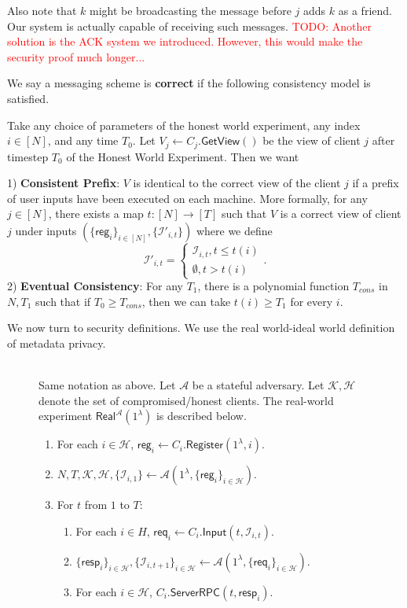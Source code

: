 \documentclass[sigconf, nonacm, balance=false, natbib=false, screen]{acmart}
\newcommand\todo[1]{\textcolor{red}{TODO: #1}}
\newcommand{\reg}{\mathsf{reg}}
\newcommand{\req}{\mathsf{req}}
\newcommand{\resp}{\mathsf{resp}}
\newcommand{\cK}{\mathcal{K}}
\newcommand{\cA}{\mathcal{A}}
\newcommand{\cI}{\mathcal{I}}
\newcommand{\cH}{\mathcal{H}}
\begin{document}
Also note that $k$ might be broadcasting the message before $j$ adds $k$ as a friend. Our system is actually capable of receiving such messages.
\todo{Another solution is the ACK system we introduced. However, this would make the security proof much longer...}
\begin{definition}[Correctness]
 We say a messaging scheme is \textbf{correct} if the following consistency model is satisfied. 
 
 Take any choice of parameters of the honest world experiment, any index $i \in [N]$, and any time $T_0$. Let $V_j \leftarrow C_j.\mathsf{GetView}()$ be the view of client $j$ after timestep $T_0$ of the Honest World Experiment. Then we want

1) \textbf{Consistent Prefix}: $V$ is identical to the correct view of the client $j$ if a prefix of user inputs have been executed on each machine. More formally, for any $j \in [N]$, there exists a map $t: [N] \to [T]$ such that  $V$ is a correct view of client $j$ under inputs $(\{\reg_i\}_{i \in [N]}, \{\cI'_{i, t}\})$
where we define
$$\cI'_{i, t} = \begin{cases}
\cI_{i, t}, t \leq t(i) \\
\emptyset, t > t(i)
\end{cases}.$$
2) \textbf{Eventual Consistency}: For any $T_1$, there is a polynomial function $T_{cons}$ in $N, T_1$ such that if $T_0 \geq T_{cons}$, then we can take $t(i) \geq T_1$ for every $i$.
\end{definition}
We now turn to security definitions. We use the real world-ideal world definition of metadata privacy.
\begin{figure}[h!]
\begin{framed}
\begin{definition} \hfill\\
Same notation as above. Let $\cA$ be a stateful adversary. Let $\cK, \cH$ denote the set of compromised/honest clients. The real-world experiment $\mathsf{Real}^{\cA}(1^{\lambda})$ is described below.
\begin{enumerate}
\item For each $i \in \cH$, $\reg_i \leftarrow C_i.\mathsf{Register}(1^{\lambda}, i)$. 
\item $N, T, \cK, \cH, \{\cI_{i, 1}\} \leftarrow \cA(1^{\lambda}, \{\reg_i\}_{i \in \cH})$.
\item For $t$ from $1$ to $T$:
    \begin{enumerate}
    \item For each $i \in H$, $\req_i \leftarrow C_i.\mathsf{Input}(t, \cI_{i, t})$.
    
    \item $\{\resp_i\}_{i \in \cH}, \{\cI_{i, t + 1}\}_{i \in \cH} \leftarrow \cA(1^{\lambda}, \{\req_i\}_{i \in \cH})$.
    
    \item For each $i \in \cH$, $C_i.\mathsf{ServerRPC}(t, \resp_i)$.
    \end{enumerate}
\end{enumerate}
\end{definition}
\end{framed}
\end{figure}
\end{document}
